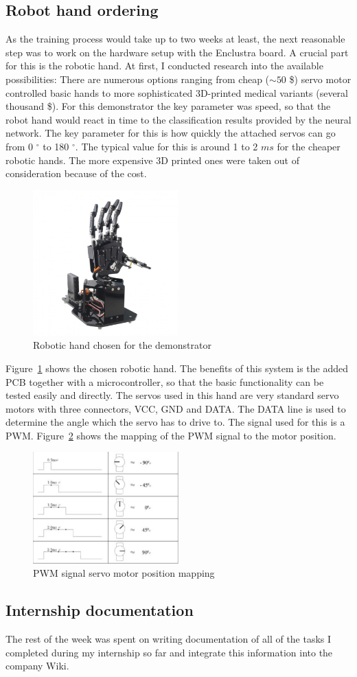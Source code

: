 \subsection{Robot hand ordering}
As the training process would take up to two weeks at least, the next reasonable step was to work on the hardware setup with the Enclustra board. A crucial part for this is the robotic hand. At first, I conducted research into the available possibilities: There are numerous options ranging from cheap ($\sim 50$ \$) servo motor controlled basic hands to more sophisticated 3D-printed medical variants (several thousand \$). For this demonstrator the key parameter was speed, so that the robot hand would react in time to the classification results provided by the neural network. The key parameter for this is how quickly the attached servos can go from 0 $^\circ$ to 180 $^\circ$. The typical value for this is around 1 to 2 $ms$ for the cheaper robotic hands. The more expensive 3D printed ones were taken out of consideration because of the cost.
\begin{figure}[!htb]
	\centering
		\includegraphics[width=0.5\textwidth]{bilder/robohand.jpg}
		\caption{Robotic hand chosen for the demonstrator}
		\label{fig:robohand}
\end{figure}
Figure~\ref{fig:robohand} shows the chosen robotic hand. The benefits of this system is the added \ac{PCB} together with a microcontroller, so that the basic functionality can be tested easily and directly. The servos used in this hand are very standard servo motors with three connectors, VCC, GND and DATA. The DATA line is used to determine the angle which the servo has to drive to. The signal used for this is a \ac{PWM}. Figure~\ref{fig:pwm_servo} shows the mapping of the \ac{PWM} signal to the motor position.
\begin{figure}[!htb]
	\centering
		\includegraphics[width=0.5\textwidth]{bilder/pwm.png}
		\caption{\acs{PWM} signal servo motor position mapping}
		\label{fig:pwm_servo}
\end{figure}
\subsection{Internship documentation}
The rest of the week was spent on writing documentation of all of the tasks I completed during my internship so far and integrate this information into the company Wiki.